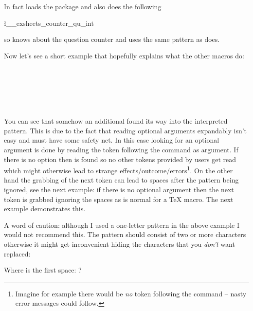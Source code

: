 \documentclass[load-preamble+]{cnltx-doc}
\begin{document}
In fact  loads the  package and also does the
following
\begin{sourcecode}
  \l__exsheets_counter_qu_int
\end{sourcecode}
so  knows about the question counter and uses the same pattern as
 does.

Now let's see a short example that hopefully explains what the other macros
do:
\begin{example}
  \setcounter{test}{11}
   \\
  \ttfamily\makeatletter
  \meaning\@cntfmts@parsed@pattern
  
  \bigskip
  \SaveCounterPattern\tmpa{}
  \meaning\tmpa \\
  \meaning\tmpb
  
  \bigskip
  \eSaveCounterPattern\tmpa{}
  \meaning\tmpa \\
  \meaning\tmpb
\end{example}
You can see that somehow an additional  found its way into the
interpreted pattern.  This is due to the fact that reading optional arguments
expandably isn't easy and must have some safety net.  In this case looking for
an optional argument is done by reading the token following the command as
argument.  If there is no option then  is found so no other tokens
provided by users get read which might otherwise lead to strange
effects/outcome/errors\footnote{Imagine for example there would be \emph{no}
  token following the command -- nasty error messages could follow.}.  On the
other hand the grabbing of the next token can lead to spaces after the pattern
being ignored, see the next example: if there is no optional argument then the
next token is grabbed ignoring the spaces as is normal for a \TeX{} macro.
The next example demonstrates this.

A word of caution: although I used a one-letter pattern in the above example I
would not recommend this.  The pattern should consist of two or more
characters otherwise it might get inconvenient hiding the characters that you
\emph{don't} want replaced:
\begin{example}
  \setcounter{test}{3}
  Where is the first space: ?\par
\end{example}
\end{document}
